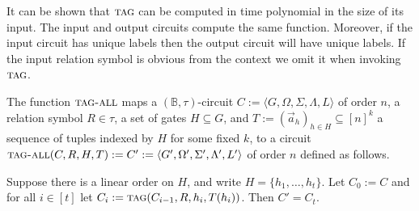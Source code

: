 \documentclass[../paper.tex]{subfiles}
\begin{document}


It can be shown that ${\normalfont\textsc{tag}}$ can be computed in time polynomial in the size
of its input. The input and output circuits compute the same function. Moreover,
if the input circuit has unique labels then the output circuit will have unique
labels. If the input relation symbol is obvious from the context we omit it when
invoking ${\normalfont\textsc{tag}}$.

\begin{definition}
  The function ${\normalfont\textsc{tag-all}}$ maps a $(\mathbb{B}, \tau)$-circuit $C := \langle
  G, \Omega, \Sigma, \Lambda, L \rangle$ of order $n$, a relation symbol $R \in
  \tau$, a set of gates $H \subseteq G$, and $T := (\vec{a}_h)_{h \in H}
  \subseteq [n]^{k}$ a sequence of tuples indexed by $H$ for some fixed $k$, to
  a circuit ${\normalfont\textsc{tag-all}}(C, R, H, T) := C' := \langle G', \Omega', \Sigma',
  \Lambda', L'\rangle$ of order $n$ defined as follows.

  Suppose there is a linear order on $H$, and write $H = \{h_1, \ldots, h_t\}$.
  Let $C_0 := C$ and for all $i \in [t]$ let $C_i := {\normalfont\textsc{tag}}(C_{i-1}, R, h_i,
  T(h_i))$. Then $C' = C_{t}$.

\end{definition}
\end{document}
